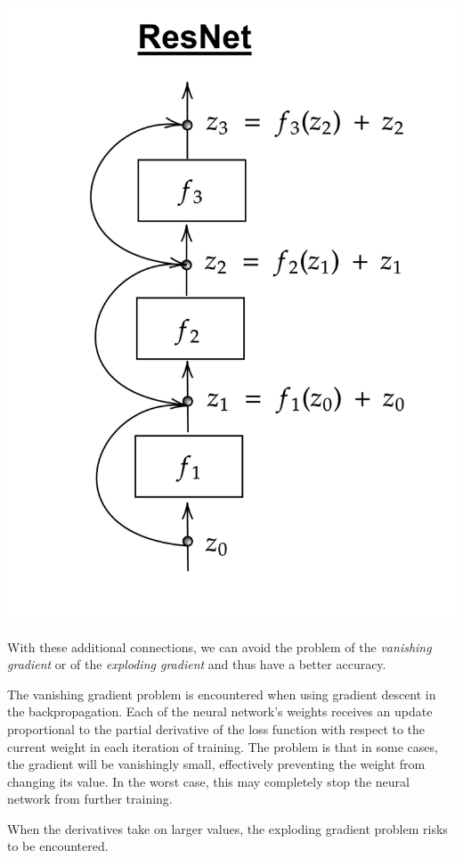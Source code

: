 \documentclass[10pt,a4paper]{article}
\theoremstyle{definition}
\theoremstyle{definition}
\begin{document}
\begin{center}
\includegraphics[scale=0.18]{resnet.png}
\end{center}

With these additional connections, we can avoid the problem of the \textit{vanishing gradient} or of the \textit{exploding gradient} and thus have a better accuracy. 

The vanishing gradient problem is encountered when using gradient descent in the backpropagation. Each of the neural network's weights receives an update proportional to the partial derivative of the loss function with respect to the current weight in each iteration of training. The problem is that in some cases, the gradient will be vanishingly small, effectively preventing the weight from changing its value. In the worst case, this may completely stop the neural network from further training.

When the derivatives take on larger values, the exploding gradient problem risks to be encountered.
\end{document}

